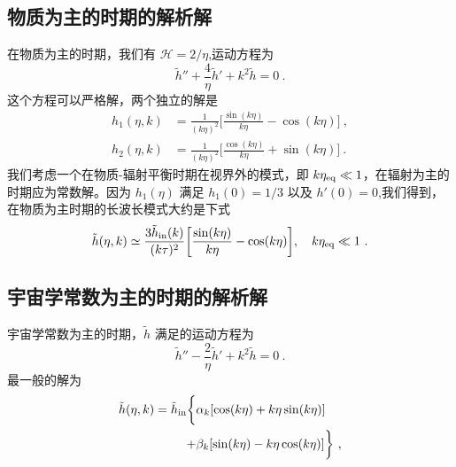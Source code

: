 \subsection{物质为主的时期的解析解}
在物质为主的时期，我们有 $\mathcal H = 2/\eta$,运动方程为
\begin{equation}
\tilde h'' + \frac{4}{\eta} \tilde h' + k^2 \tilde h = 0~.
\end{equation}
这个方程可以严格解，两个独立的解是
\begin{equation}
\begin{aligned}
h_1(\eta,k) & = \frac{1}{(k\eta)^2} \bigg[ \frac{\sin(k\eta)}{k\eta}  - \cos(k\eta) \bigg]~, \\
h_2(\eta,k) & = \frac{1}{(k\eta)^2} \bigg[ \frac{\cos(k\eta)}{k\eta} + \sin(k\eta) \bigg]~.
\end{aligned}
\end{equation}
我们考虑一个在物质-辐射平衡时期在视界外的模式，即 $k\eta_{\rm eq}\ll 1$，在辐射为主的时期应为常数解。因为 $h_1(\eta)$ 满足 $h_1(0) = 1/3$ 以及 $h'(0) = 0$,我们得到，在物质为主时期的长波长模式大约是下式
\begin{equation}
\tilde h (\eta,k) \simeq \frac{3\tilde h_{\rm in}(k)}{(k\tau)^2} \bigg[ \frac{\sin(k\eta)}{k\eta} - \cos(k\eta) \bigg], \quad k\eta_{\rm eq}\ll 1~.
\end{equation}


\subsection{宇宙学常数为主的时期的解析解}
宇宙学常数为主的时期，$\tilde h$ 满足的运动方程为
\begin{equation}
\tilde h'' - \frac{2}{\eta} \tilde h' + k^2 \tilde h = 0~.
\end{equation}
最一般的解为
\begin{equation}
\begin{aligned}
\tilde h(\eta,k) = \tilde h_{\rm in} \bigg\{ & \alpha_k [\cos(k\eta) + k\eta \sin(k\eta)] \\
+ & \beta_k [\sin(k\eta) - k\eta\cos(k\eta) ] \bigg\}~,
\end{aligned}
\end{equation}


















